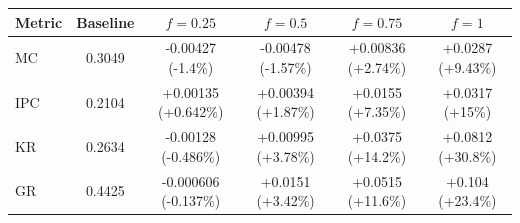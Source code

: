 \begin{tabular}{lccccc}
\toprule
Metric & Baseline & $f=0.25$ & $f=0.5$ & $f=0.75$ & $f=1$ \\
\midrule
MC & 0.3049 & -0.00427 (-1.4\%) & -0.00478 (-1.57\%) & +0.00836 (+2.74\%) & +0.0287 (+9.43\%) \\
IPC & 0.2104 & +0.00135 (+0.642\%) & +0.00394 (+1.87\%) & +0.0155 (+7.35\%) & +0.0317 (+15\%) \\
KR & 0.2634 & -0.00128 (-0.486\%) & +0.00995 (+3.78\%) & +0.0375 (+14.2\%) & +0.0812 (+30.8\%) \\
GR & 0.4425 & -0.000606 (-0.137\%) & +0.0151 (+3.42\%) & +0.0515 (+11.6\%) & +0.104 (+23.4\%) \\
\bottomrule
\end{tabular}
